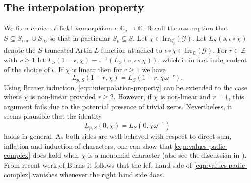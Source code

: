 \documentclass[12pt]{amsart}
\theoremstyle{plain}
\theoremstyle{remark}
\theoremstyle{definition}
\numberwithin{equation}{section}
\begin{document}
\subsection{The interpolation property}\label{subsec:interpolation-property}
We fix a choice of field isomorphism $\iota:{\mathbb{C}}_{p} \rightarrow {\mathbb{C}}$.
Recall the assumption that $S \subseteq S_{\mathrm{ram}} \cup S_{\infty}$ so that in particular $S_{p} \subseteq S$.
Let $\chi \in {\mathrm{Irr}}_{{\mathbb{Q}}_{p}^{c}}(\mathcal{G})$.
Let $L_{S}(s,\iota \circ \chi)$ denote the $S$-truncated Artin $L$-function attached to $\iota \circ \chi \in {\mathrm{Irr}}_{\mathbb{C}}(\mathcal{G})$.
For $r \in {\mathbb{Z}}$ with $r \geq 1$ let $L_{S}(1-r, \chi) = \iota^{-1}(L_{S}(s,\iota \circ \chi))$, which is in fact independent of the choice of $\iota$.
If $\chi$ is linear then for  $r \geq 1$ we have
\begin{equation} \label{eqn:interpolation-property}
L_{p,S}(1-r, \chi) = L_{S}(1-r,\chi\omega^{-r}).
\end{equation}
Using Brauer induction, \eqref{eqn:interpolation-property} can be extended to the case where $\chi$ is non-linear provided $r \geq 2$.
However, if $\chi$ is non-linear and $r=1$,
this argument fails due to the potential presence of trivial zeros.
Nevertheless, it seems plausible that the identity
\begin{equation}\label{eqn:values-padic-complex}
        L_{p,S}(0, \chi) = L_S(0, \chi \omega^{-1})
\end{equation}
holds in general.
As both sides are well-behaved with respect to direct sum, inflation and induction of characters, one can show that
\eqref{eqn:values-padic-complex} does hold when $\chi$ is a monomial character
(also see the discussion in \cite[\S 2]{MR656068}).
From recent work of Burns \cite[Theorem 5.2 (i)]{burns-p-adic} it follows that the left hand side of \eqref{eqn:values-padic-complex}
vanishes whenever the right hand side does.
\end{document}

